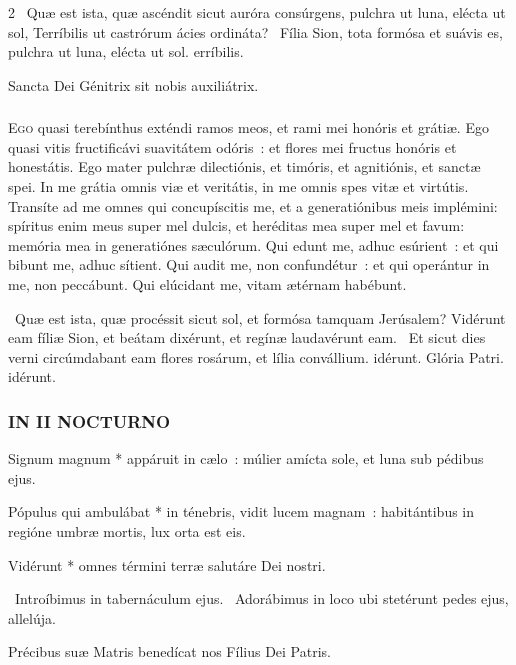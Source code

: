 \documentclass[9pt,twoside]{extarticle}
\begin{document}
\begin{multicols}{2}
~Quæ est ista, quæ ascéndit sicut auróra consúrgens, pulchra ut luna, elécta ut sol, \textred{*} Terríbilis ut castrórum ácies ordináta? 
~Fília Sion, tota formósa et suávis es, pulchra ut luna, elécta ut sol. erríbilis.

\medskip
{\small {} Sancta Dei Génitrix sit nobis auxiliátrix.}
\subsubsection*{\center {}}
\lettrine{E}{go} quasi terebínthus exténdi ramos meos, et rami mei honóris et grátiæ.
Ego quasi vitis fructificávi suavitátem odóris~: et flores mei fructus honóris et honestátis.
Ego mater pulchræ dilectiónis, et timóris, et agnitiónis, et sanctæ spei.
In me grátia omnis viæ et veritátis, in me omnis spes vitæ et virtútis.
Transíte ad me omnes qui concupíscitis me, et a generatiónibus meis implémini:
spíritus enim meus super mel dulcis, et heréditas mea super mel et favum:
memória mea in generatiónes sæculórum.
Qui edunt me, adhuc esúrient~: et qui bibunt me, adhuc sítient.
Qui audit me, non confundétur~: et qui operántur in me, non peccábunt.
Qui elúcidant me, vitam ætérnam habébunt.

~Quæ est ista, quæ procéssit sicut sol, et formósa tamquam Jerúsalem? \textred{*} Vidérunt eam fíliæ Sion, et beátam dixérunt, et regínæ laudavérunt eam. ~Et sicut dies verni circúmdabant eam flores rosárum, et lília convállium. idérunt. Glória Patri. idérunt.

\subsubsection*{\center \normalfont \textsc{IN II NOCTURNO}}

\smallskip
{} Signum magnum * appáruit in cælo~: múlier amícta sole, et luna sub pédibus ejus.

 Pópulus qui ambulábat * in ténebris, vidit lucem magnam~: habitántibus in regióne umbræ mortis, lux orta est eis.

 Vidérunt * omnes términi terræ salutáre Dei nostri.

\smallskip
{}~Introíbimus in tabernáculum ejus. ~Adorábimus in loco ubi stetérunt pedes ejus, allelúja.

\medskip
\small {} Précibus suæ Matris benedícat nos Fílius Dei Patris.


\end{multicols}
\end{document}
